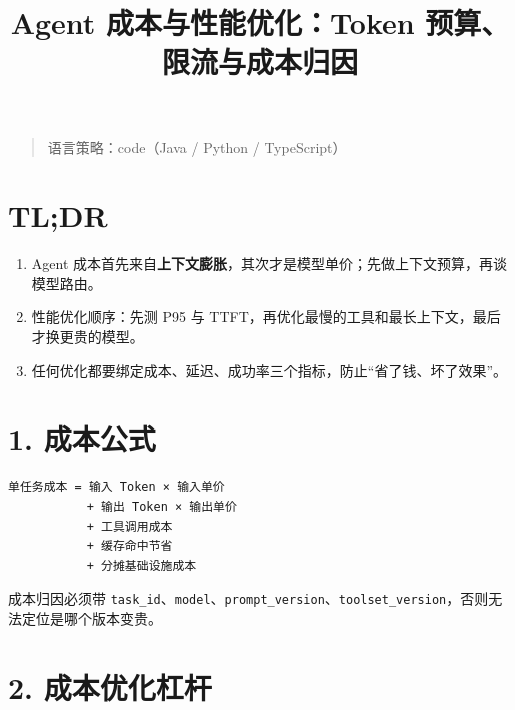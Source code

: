 \documentclass[9pt,a4paper,twocolumn]{ctexart}
\begin{document}
\title{Agent 成本与性能优化：Token 预算、限流与成本归因}
\date{}
\maketitle
{}

\begin{quote}
语言策略：code（Java / Python / TypeScript）
\end{quote}



\section*{TL;DR}

\begin{enumerate}[itemsep=1pt, topsep=2pt]
  \item Agent 成本首先来自\textbf{上下文膨胀}，其次才是模型单价；先做上下文预算，再谈模型路由。
  \item 性能优化顺序：先测 P95 与 TTFT，再优化最慢的工具和最长上下文，最后才换更贵的模型。
  \item 任何优化都要绑定成本、延迟、成功率三个指标，防止“省了钱、坏了效果”。
\end{enumerate}


\section*{1. 成本公式}


\begin{lstlisting}
单任务成本 = 输入 Token × 输入单价
           + 输出 Token × 输出单价
           + 工具调用成本
           + 缓存命中节省
           + 分摊基础设施成本
\end{lstlisting}



成本归因必须带 \texttt{task\_id}、\texttt{model}、\texttt{prompt\_version}、\texttt{toolset\_version}，否则无法定位是哪个版本变贵。



\section*{2. 成本优化杠杆}
\end{document}
